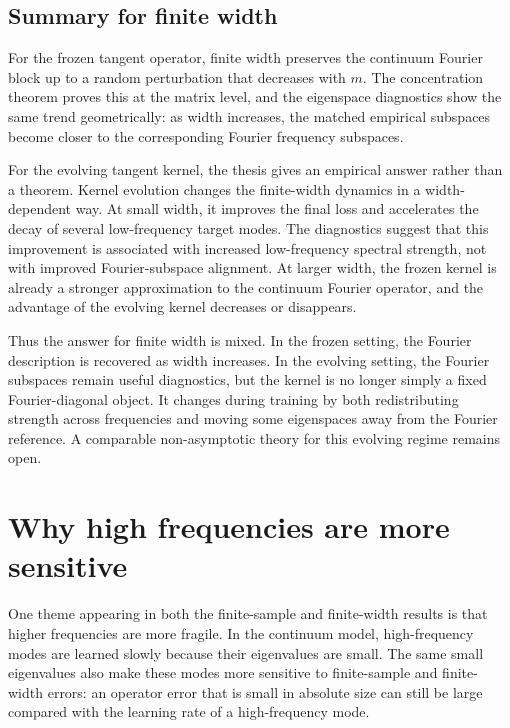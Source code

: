 \subsection{Summary for finite width}
\label{subsec:discussion-finite-width-summary}

For the frozen tangent operator, finite width preserves the continuum Fourier
block up to a random perturbation that decreases with \(m\). The concentration
theorem proves this at the matrix level, and the eigenspace diagnostics show the
same trend geometrically: as width increases, the matched empirical subspaces
become closer to the corresponding Fourier frequency subspaces.

For the evolving tangent kernel, the thesis gives an empirical answer rather
than a theorem. Kernel evolution changes the finite-width dynamics in a
width-dependent way. At small width, it improves the final loss and accelerates
the decay of several low-frequency target modes. The diagnostics suggest that
this improvement is associated with increased low-frequency spectral strength,
not with improved Fourier-subspace alignment. At larger width, the frozen kernel
is already a stronger approximation to the continuum Fourier operator, and the
advantage of the evolving kernel decreases or disappears.

Thus the answer for finite width is mixed. In the frozen setting, the Fourier
description is recovered as width increases. In the evolving setting, the
Fourier subspaces remain useful diagnostics, but the kernel is no longer simply
a fixed Fourier-diagonal object. It changes during training by both
redistributing strength across frequencies and moving some eigenspaces away from
the Fourier reference. A comparable non-asymptotic theory for this evolving
regime remains open.

\section{Why high frequencies are more sensitive}
\label{sec:discussion-high-frequency-sensitivity}

One theme appearing in both the finite-sample and finite-width results is that
higher frequencies are more fragile. In the continuum model, high-frequency
modes are learned slowly because their eigenvalues are small. The same small
eigenvalues also make these modes more sensitive to finite-sample and
finite-width errors: an operator error that is small in absolute size can still
be large compared with the learning rate of a high-frequency mode.

